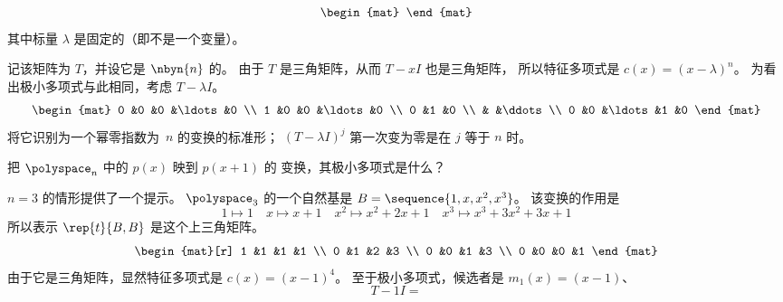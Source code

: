\begin{exercises}
\begin{equation*}
\begin{mat}
      \end{mat}
    \end{equation*}
    其中标量 $\lambda$ 是固定的（即不是一个变量）。
    \begin{answer}
      记该矩阵为 $T$，并设它是 \( \nbyn{n} \) 的。
      由于 $T$ 是三角矩阵，从而 $T-xI$ 也是三角矩阵，
      所以特征多项式是 $c(x)=(x-\lambda)^n$。
      为看出极小多项式与此相同，考虑
      $T-\lambda I$。
      \begin{equation*}
        \begin{mat}
          0        &0        &0          &\ldots  &0  \\
          1        &0        &0          &\ldots  &0  \\
          0        &1        &0                       \\
                   &         &\ddots                  \\
          0        &0        &\ldots     &1       &0      
        \end{mat}
      \end{equation*}
      将它识别为一个幂零指数为~$n$ 的变换的标准形；
      $(T-\lambda I)^j$ 第一次变为零是在 $j$ 等于 $n$ 时。
    \end{answer}
  \item 
    把 \( \polyspace_n \) 中的 \( p(x) \) 映到 \( p(x+1) \) 的
    变换，其极小多项式是什么？
    \begin{answer}
      $n=3$ 的情形提供了一个提示。
      $\polyspace_3$ 的一个自然基是  
      $B=\sequence{1,x,x^2,x^3}$。
      该变换的作用是
      \begin{equation*}
        1\mapsto 1
        \quad
        x\mapsto x+1
        \quad
        x^2\mapsto x^2+2x+1
        \quad
        x^3\mapsto x^3+3x^2+3x+1
      \end{equation*}
      所以表示 $\rep{t}{B,B}$ 是这个上三角矩阵。
      \begin{equation*}
        \begin{mat}[r]
          1  &1  &1  &1  \\
          0  &1  &2  &3  \\
          0  &0  &1  &3  \\
          0  &0  &0  &1
        \end{mat}
      \end{equation*}
      由于它是三角矩阵，显然特征多项式是
      $c(x)=(x-1)^4$。
      至于极小多项式，候选者是 $m_1(x)=(x-1)$、
      \begin{equation*}
        T-1I=

\end{equation*}
\end{answer}
\end{exercises}
